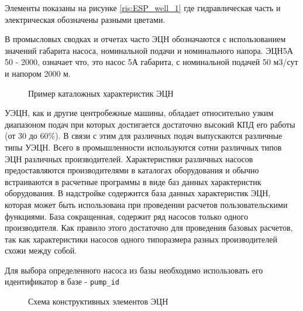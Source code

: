Элементы показаны на рисунке \ref{ris:ESP_well_1} где гидравлическая часть и электрическая обозначены разными цветами.

В промысловых сводках и отчетах часто ЭЦН обозначаются с использованием значений габарита насоса, номинальной подачи и номинального напора. ЭЦН5А 50 - 2000, означает что, это насос 5А габарита, с номинальной подачей 50 м3/сут и напором 2000 м. 

\begin{figure}[h!]
	\caption{Пример каталожных характеристик ЭЦН}
	\label{ris:novomet_ESP_80}
\end{figure}

УЭЦН, как и другие центробежные машины, обладает относительно узким диапазоном подач при которых достигается достаточно высокий КПД его работы (от 30 до 60\%). В связи с этим для различных подач выпускаются различные типы УЭЦН. Всего в промышленности используются сотни различных типов ЭЦН различных производителей. Характеристики различных насосов предоставляются производителями в каталогах оборудования и обычно встраиваются в расчетные программы в виде баз данных характеристик оборудования. В надстройке \unf{} содержится база данных характеристик ЭЦН, которая может быть использована при проведении расчетов пользовательскими функциями. База сокращенная, содержит ряд насосов только одного производителя. Как правило этого достаточно для проведения базовых расчетов, так как характеристики насосов одного типоразмера разных производителей схожи между собой. 

Для выбора определенного насоса из базы необходимо использовать его идентификатор в базе - \texttt{pump_id}

\begin{figure}[h!]
	\begin{center}
		
		\caption{Схема конструктивных элементов ЭЦН}
		\label{ris:ESP_well_2}
	\end{center}
\end{figure}


